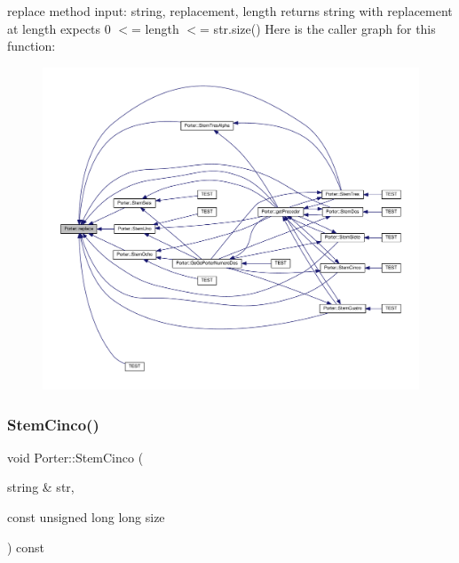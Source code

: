 replace method input\+: string, replacement, length returns string with replacement at length expects 0 $<$= length $<$= str.\+size() Here is the caller graph for this function\+:
\nopagebreak
\begin{figure}[H]
\begin{center}
\leavevmode
\includegraphics[width=350pt]{class_porter_aba12641d0e612b264097a35e4f2ffb45_icgraph}
\end{center}
\end{figure}
\mbox{\label{class_porter_a916f45b55a1bbdaff7ce1db3d9a42813}} 
\subsubsection{\texorpdfstring{Stem\+Cinco()}{StemCinco()}}
{\footnotesize\ttfamily void Porter\+::\+Stem\+Cinco (\begin{DoxyParamCaption}\item[{string \&}]{str,  }\item[{const unsigned long long}]{size }\end{DoxyParamCaption}) const}

